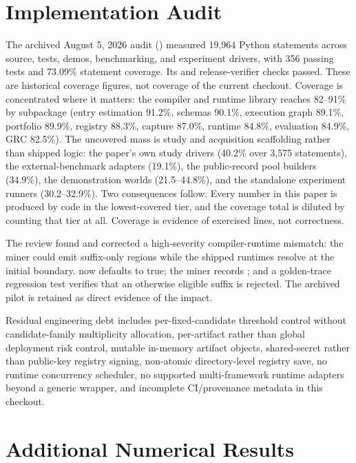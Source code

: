 \section{Implementation Audit}
\label{app:audit}

The archived August 5, 2026 audit ()
measured 19,964 Python statements across source, tests, demos, benchmarking,
and experiment drivers, with 356 passing tests and 73.09\% statement coverage.
Its  and release-verifier checks passed. These are historical
coverage figures, not coverage of the current checkout.  Coverage is concentrated where it matters: the compiler and runtime library reaches
82--91\% by subpackage (entry estimation 91.2\%, schemas 90.1\%, execution graph 89.1\%,
portfolio 89.9\%, registry 88.3\%, capture 87.0\%, runtime 84.8\%, evaluation 84.9\%,
GRC 82.5\%).  The uncovered mass is study and acquisition scaffolding rather than shipped
logic: the paper's own study drivers (40.2\% over 3,575 statements), the external-benchmark
adapters (19.1\%), the public-record pool builders (34.9\%), the demonstration worlds
(21.5--44.8\%), and the standalone experiment runners (30.2--32.9\%).  Two consequences
follow.  Every number in this paper is produced by code in the lowest-covered tier, and the
coverage total is diluted by counting that tier at all.  Coverage is evidence of exercised
lines, not correctness.

The review found and corrected a high-severity compiler\hyp{}runtime mismatch: the miner could
emit suffix-only regions while the shipped runtimes resolve at the initial boundary.
 now defaults to true; the miner records
; and a golden-trace regression test verifies that an otherwise
eligible suffix is rejected.  The archived pilot is retained as direct evidence of the
impact.

Residual engineering debt includes per-fixed-candidate threshold control without
candidate-family multiplicity allocation, per-artifact rather than global deployment risk
control, mutable
in-memory artifact objects, shared-secret rather than public-key registry signing,
non-atomic directory\hyp{}level registry save, no runtime concurrency scheduler, no supported
multi-framework runtime adapters beyond a generic wrapper, and incomplete CI/provenance
metadata in this checkout.

\clearpage

\section{Additional Numerical Results}
\label{app:numerical}

